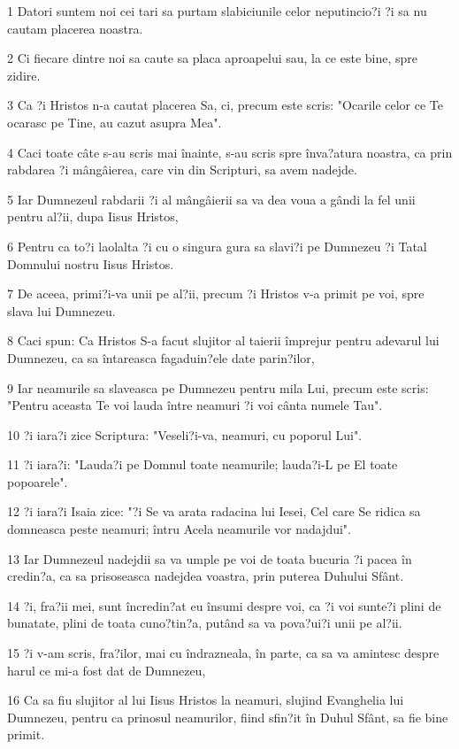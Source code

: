 \par 1 Datori suntem noi cei tari sa purtam slabiciunile celor neputincio?i ?i sa nu cautam placerea noastra.
\par 2 Ci fiecare dintre noi sa caute sa placa aproapelui sau, la ce este bine, spre zidire.
\par 3 Ca ?i Hristos n-a cautat placerea Sa, ci, precum este scris: "Ocarile celor ce Te ocarasc pe Tine, au cazut asupra Mea".
\par 4 Caci toate câte s-au scris mai înainte, s-au scris spre înva?atura noastra, ca prin rabdarea ?i mângâierea, care vin din Scripturi, sa avem nadejde.
\par 5 Iar Dumnezeul rabdarii ?i al mângâierii sa va dea voua a gândi la fel unii pentru al?ii, dupa Iisus Hristos,
\par 6 Pentru ca to?i laolalta ?i cu o singura gura sa slavi?i pe Dumnezeu ?i Tatal Domnului nostru Iisus Hristos.
\par 7 De aceea, primi?i-va unii pe al?ii, precum ?i Hristos v-a primit pe voi, spre slava lui Dumnezeu.
\par 8 Caci spun: Ca Hristos S-a facut slujitor al taierii împrejur pentru adevarul lui Dumnezeu, ca sa întareasca fagaduin?ele date parin?ilor,
\par 9 Iar neamurile sa slaveasca pe Dumnezeu pentru mila Lui, precum este scris: "Pentru aceasta Te voi lauda între neamuri ?i voi cânta numele Tau".
\par 10 ?i iara?i zice Scriptura: "Veseli?i-va, neamuri, cu poporul Lui".
\par 11 ?i iara?i: "Lauda?i pe Domnul toate neamurile; lauda?i-L pe El toate popoarele".
\par 12 ?i iara?i Isaia zice: "?i Se va arata radacina lui Iesei, Cel care Se ridica sa domneasca peste neamuri; întru Acela neamurile vor nadajdui".
\par 13 Iar Dumnezeul nadejdii sa va umple pe voi de toata bucuria ?i pacea în credin?a, ca sa prisoseasca nadejdea voastra, prin puterea Duhului Sfânt.
\par 14 ?i, fra?ii mei, sunt încredin?at eu însumi despre voi, ca ?i voi sunte?i plini de bunatate, plini de toata cuno?tin?a, putând sa va pova?ui?i unii pe al?ii.
\par 15 ?i v-am scris, fra?ilor, mai cu îndrazneala, în parte, ca sa va amintesc despre harul ce mi-a fost dat de Dumnezeu,
\par 16 Ca sa fiu slujitor al lui Iisus Hristos la neamuri, slujind Evanghelia lui Dumnezeu, pentru ca prinosul neamurilor, fiind sfin?it în Duhul Sfânt, sa fie bine primit.
